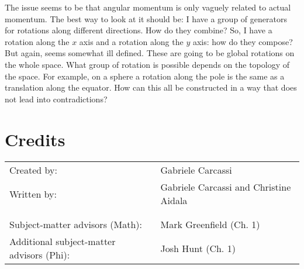 \documentclass[11pt,letterpaper,fleqn]{memoir} %
\begin{document}
The issue seems to be that angular momentum is only vaguely related to actual momentum. The best way to look at it should be: I have a group of generators for rotations along different directions. How do they combine? So, I have a rotation along the $x$ axis and a rotation along the $y$ axis: how do they compose? But again, seems somewhat ill defined. These are going to be global rotations on the whole space. What group of rotation is possible depends on the topology of the space. For example, on a sphere a rotation along the pole is the same as a translation along the equator. How can this all be constructed in a way that does not lead into contradictions?




\backmatter

\chapter[Credits]{\centering Credits}

\begin{table}[h]
\centering
\begin{tabular}{R{0.45\textwidth} L{0.5\textwidth}}
Created by: & Gabriele Carcassi \\
Written by: & Gabriele Carcassi and Christine Aidala \\
& \\
& \\
Subject-matter advisors (Math): & Mark Greenfield (Ch. 1) \\
Additional subject-matter advisors (Phi): & Josh Hunt (Ch. 1) \\




\end{tabular} 
\end{table}


	
\end{document}

